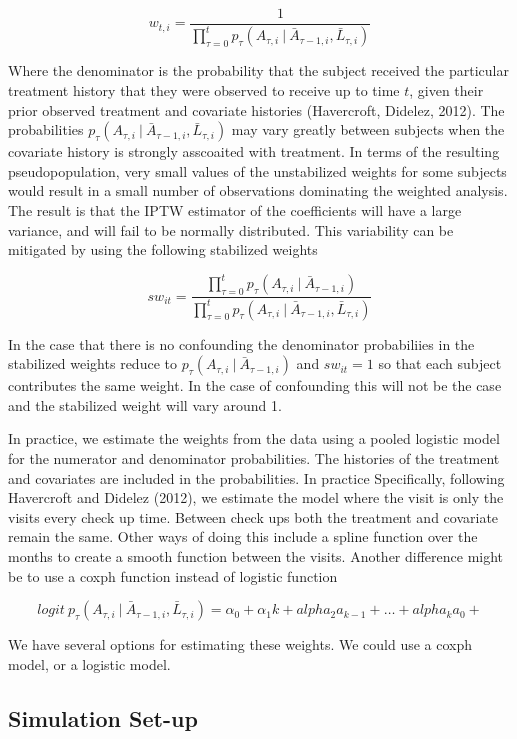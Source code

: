 \documentclass[11pt]{article}
\begin{document}
\[w_{t,i} = \frac{1}{\prod_{\tau=0} ^ t p_{\tau} (A_{\tau, i}\ |\ \bar A_{\tau-1, i}, \bar L_{\tau, i})}\]

Where the denominator is the probability that the subject received the
particular treatment history that they were observed to receive up to
time \(t\), given their prior observed treatment and covariate histories
(Havercroft, Didelez, 2012). The probabilities
\(p_{\tau} (A_{\tau, i}\ |\ \bar A_{\tau-1, i}, \bar L_{\tau, i})\) may
vary greatly between subjects when the covariate history is strongly
asscoaited with treatment. In terms of the resulting pseudopopulation,
very small values of the unstabilized weights for some subjects would
result in a small number of observations dominating the weighted
analysis. The result is that the IPTW estimator of the coefficients will
have a large variance, and will fail to be normally distributed. This
variability can be mitigated by using the following stabilized weights

\[sw_{it} = \frac{\prod_{\tau=0} ^ t p_{\tau} (A_{\tau, i}\ |\ \bar A_{\tau-1, i})} {\prod_{\tau=0} ^ t p_{\tau} (A_{\tau, i}\ |\ \bar A_{\tau-1, i}, \bar L_{\tau, i})}\]

In the case that there is no confounding the denominator probabiliies in
the stabilized weights reduce to
\(p_{\tau} (A_{\tau, i}\ |\ \bar A_{\tau-1, i})\) and \(sw_{it}=1\) so
that each subject contributes the same weight. In the case of
confounding this will not be the case and the stabilized weight will
vary around 1.

In practice, we estimate the weights from the data using a pooled
logistic model for the numerator and denominator probabilities. The
histories of the treatment and covariates are included in the
probabilities. In practice Specifically, following Havercroft and
Didelez (2012), we estimate the model where the visit is only the visits
every check up time. Between check ups both the treatment and covariate
remain the same. Other ways of doing this include a spline function over
the months to create a smooth function between the visits. Another
difference might be to use a coxph function instead of logistic function

\[logit\ p_{\tau} (A_{\tau, i}\ |\ \bar A_{\tau-1, i}, \bar L_{\tau, i}) = \alpha_0 + \alpha_1 k + alpha_2 a_{k-1} + \dots + alpha_k a_0 + \]

We have several options for estimating these weights. We could use a
coxph model, or a logistic model.

\subsection{Simulation Set-up}\label{simulation-set-up}
\end{document}
